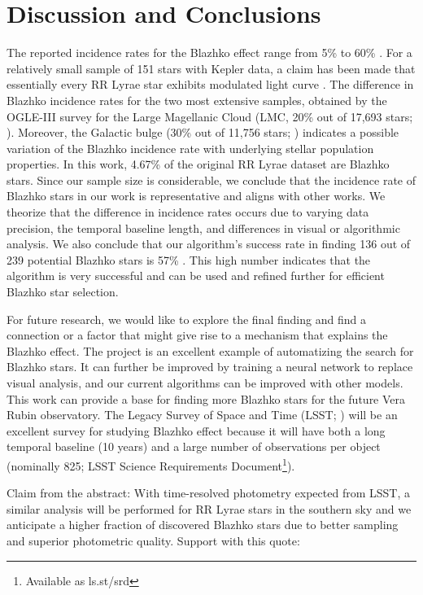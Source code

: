 
\section{Discussion and Conclusions\label{sec:discussion}}

The reported incidence rates for the Blazhko effect
range from 5\% \citep{2007MNRAS.377.1263S} to 60\% \citep{2014A&A...570A.100S}. For a relatively small sample of
151 stars with Kepler data, a claim has been made that essentially every RR Lyrae star exhibits modulated light curve
\citep{2018A&A...614L...4K}. The difference in Blazhko incidence rates for the two most extensive samples, obtained
by the OGLE-III survey for the Large Magellanic Cloud (LMC, 20\% out of 17,693 stars; \citealt{2009AcA....59....1S}).
Moreover, the Galactic bulge (30\% out of 11,756 stars; \citealt{2011AcA....61....1S}) indicates a possible variation of
the Blazhko incidence rate with underlying stellar population properties. In this work, 4.67\% of the original RR Lyrae dataset are Blazhko stars. Since our sample size is considerable, we conclude that the incidence rate of Blazhko stars in our work is representative and aligns with other works. We theorize that the difference in incidence rates occurs due to varying data precision, the temporal baseline length, and differences in visual or algorithmic analysis.
We also conclude that our algorithm's success rate in finding 136 out of 239 potential Blazhko stars is 57\% . This high number indicates that the algorithm is very successful and can be used and refined further for efficient Blazhko star selection. 

For future research, we would like to explore the final finding and find a connection or a factor that might give rise to a mechanism that explains the Blazhko effect. The project is an excellent example of automatizing the search for Blazhko stars. It can further be improved by training a neural network to replace visual analysis, and our current algorithms can be improved with other models. This work can provide a base for finding more Blazhko stars for the future Vera Rubin observatory. The Legacy Survey of Space and Time (LSST; \citealt{2019ApJ...873..111I}) will be an excellent survey for studying Blazhko effect
\citep{2022ApJS..258....4H} because it will have both a long temporal
baseline (10 years) and a large number of observations per object
(nominally 825; LSST Science Requirements Document\footnote{Available as ls.st/srd}).


Claim from the abstract: With time-resolved photometry expected from LSST, a similar analysis will be performed for
RR Lyrae stars in the southern sky and we anticipate a higher fraction of discovered Blazhko stars due to better sampling
and superior photometric quality.  Support with this quote:

